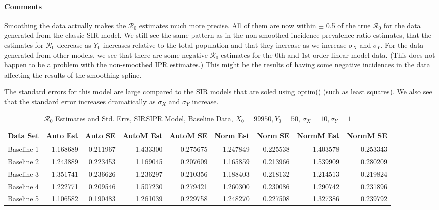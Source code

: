 \documentclass[12pt]{article}
\newcommand{\rr}{\ensuremath{\mathcal{R}_0}}
\begin{document}
\paragraph{Comments}

Smoothing the data actually makes the $\rr$ estimates much more precise. All of them are now within $\pm$ 0.5 of the true $\rr$ for the data generated from the classic SIR model. We still see the same pattern as in the non-smoothed incidence-prevalence ratio estimates, that the estimates for $\rr$ decrease as $Y_0$ increases relative to the total population and that they increase as we increase $\sigma_X$ and $\sigma_Y$. For the data generated from other models, we see that there are some negative $\rr$ estimates for the 0th and 1st order linear model data. (This does not happen to be a problem with the non-smoothed IPR estimates.) This might be the results of having some negative incidences in the data affecting the results of the smoothing spline. 

The standard errors for this model are large compared to the SIR models that are soled using optim() (such as least squares). We also see that the standard error increases dramatically as $\sigma_X$ and $\sigma_Y$ increase. 

\begin{table}[H]
	
	\caption{$\rr$ Estimates and Std. Errs, SIRSIPR Model,
		Baseline Data, $X_0 = 99950, Y_0 = 50$, 
		$\sigma_X = 10, \sigma_Y = 1$}
	\begin{footnotesize}
		\hskip -1cm
		\begin{tabular}{l|r|r|r|r|r|r|r|r}
			\hline
			Data Set & Auto Est & Auto SE & AutoM Est & AutoM SE & Norm Est & Norm SE & NormM Est & NormM SE\\
			\hline
			Baseline 1 & 1.168689 & 0.211967 & 1.433300 & 0.275675 & 1.247849 & 0.225538 & 1.403578 & 0.253343\\
			\hline
			Baseline 2 & 1.243889 & 0.223453 & 1.169045 & 0.207609 & 1.165859 & 0.213966 & 1.539909 & 0.280209\\
			\hline
			Baseline 3 & 1.351741 & 0.236626 & 1.236297 & 0.210356 & 1.188403 & 0.218132 & 1.214513 & 0.219824\\
			\hline
			Baseline 4 & 1.222771 & 0.209546 & 1.507230 & 0.279421 & 1.260300 & 0.230086 & 1.290742 & 0.231896\\
			\hline
			Baseline 5 & 1.106582 & 0.190483 & 1.261039 & 0.229758 & 1.248270 & 0.227508 & 1.327386 & 0.239792\\
			\hline
		\end{tabular}
	\end{footnotesize}
\end{table}
\end{document}
